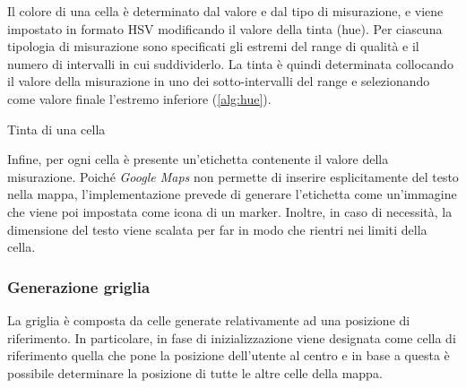 \documentclass[11pt]{article}
\def\gmaps{\textit{Google Maps}}
\begin{document}
Il colore di una cella è determinato dal valore e dal tipo di misurazione, e viene impostato in formato HSV modificando il valore della tinta (hue).
Per ciascuna tipologia di misurazione sono specificati gli estremi del range di qualità e il numero di intervalli in cui suddividerlo.
La tinta è quindi determinata collocando il valore della misurazione in uno dei sotto-intervalli del range e selezionando come valore finale l'estremo inferiore (\cref{alg:hue}).

\begin{algorithm}[H]
  \caption{Tinta di una cella}\label{alg:hue}
  \SetAlgoLined
\end{algorithm}

Infine, per ogni cella è presente un'etichetta contenente il valore della misurazione. Poiché \gmaps{} non permette di inserire esplicitamente del testo nella mappa, l'implementazione prevede di generare l'etichetta come un'immagine che viene poi impostata come icona di un marker. Inoltre, in caso di necessità, la dimensione del testo viene scalata per far in modo che rientri nei limiti della cella.


\subsubsection{Generazione griglia}
La griglia è composta da celle generate relativamente ad una posizione di riferimento. In particolare, in fase di inizializzazione viene designata come cella di riferimento quella che pone la posizione dell'utente al centro e in base a questa è possibile determinare la posizione di tutte le altre celle della mappa. 
\end{document}
